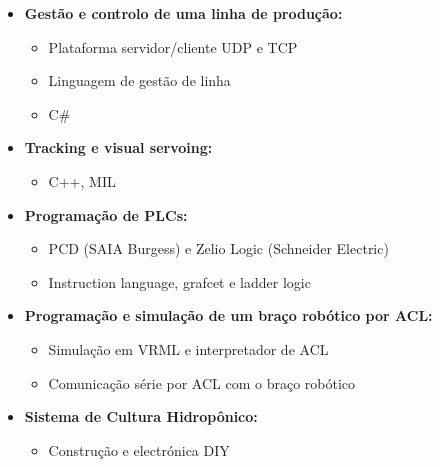 \documentclass[a4paper,portuguese]{article}
\begin{document}
\begin{itemize}
    \item[] {\bf  Gestão e controlo de uma linha de produção:}\\ \vspace{-7mm}
    \begin{itemize}
    \setlength{\itemsep}{-1mm}
        \item Plataforma servidor/cliente UDP e TCP
        \item Linguagem de gestão de linha
        \item C\#
    \end{itemize}

    \item[] {\bf Tracking e visual servoing:}\\ \vspace{-7mm}
    \begin{itemize}
        \setlength{\itemsep}{-1mm}
        \item C++, MIL
    \end{itemize}

    \item[] {\bf Programação de PLCs:}\\ \vspace{-7mm}
    \begin{itemize}
        \setlength{\itemsep}{-1mm}
        \item PCD (SAIA Burgess) e Zelio Logic (Schneider Electric)
        \item Instruction language, grafcet e ladder logic
    \end{itemize}

    \item[] {\bf  Programação e simulação de um braço robótico por ACL:}\\ \vspace{-7mm}
    \begin{itemize}
    \setlength{\itemsep}{-1mm}
        \item Simulação em VRML e interpretador de  ACL
        \item Comunicação série por ACL com o braço robótico
    \end{itemize}

    \item[] {\bf Sistema de Cultura Hidropônico:}\\ \vspace{-7mm}
    \begin{itemize}
    \setlength{\itemsep}{-1mm}
        \item Construção e electrónica DIY
    \end{itemize}


\end{itemize}
\end{document}
